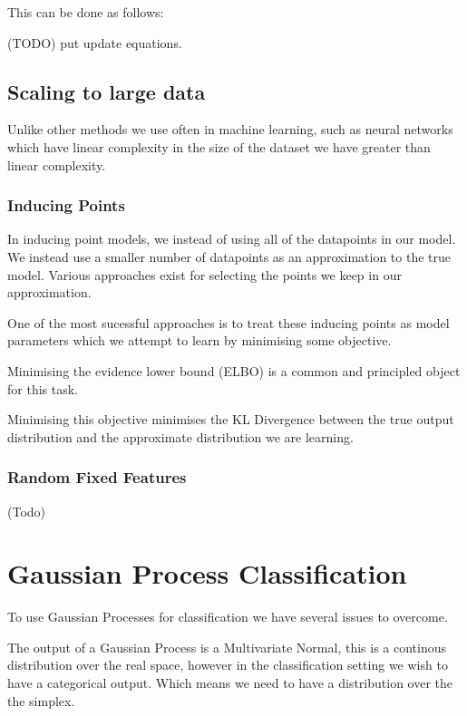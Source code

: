 \documentclass[12pt, a4paper]{report}
\theoremstyle{definition}
\begin{document}
This can be done as follows: 

(TODO) put update equations.

\subsection{Scaling to large data}

Unlike other methods we use often in machine learning, such as neural networks which have linear complexity in the size of the dataset we have greater than linear complexity.

\subsubsection{Inducing Points}

In inducing point models, we instead of using all of the datapoints in our model. We instead use a smaller number of datapoints as an approximation to the true model. Various approaches exist for selecting the points we keep in our approximation.

One of the most sucessful approaches is to treat these inducing points as model parameters which we attempt to learn by minimising some objective.

Minimising the evidence lower bound (ELBO) is a common and principled object for this task.

Minimising this objective minimises the KL Divergence between the true output distribution and the approximate distribution we are learning.

\subsubsection{Random Fixed Features}

(Todo)





\section{Gaussian Process Classification}


To use Gaussian Processes for classification we have several issues to overcome.

The output of a Gaussian Process is a Multivariate Normal, this is a continous distribution over the real space, however in the classification setting we wish to have a categorical output. Which means we need to have a distribution over the the simplex.
\end{document}
